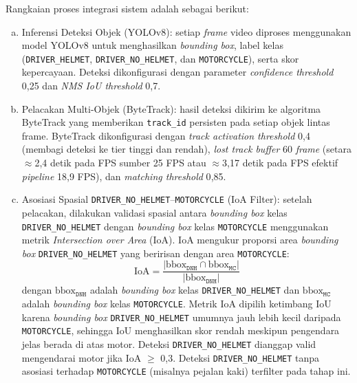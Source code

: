 Rangkaian proses integrasi sistem adalah sebagai berikut:
\begin{enumerate}[a.]
  \item {Inferensi Deteksi Objek (YOLOv8)}: setiap \textit{frame} video diproses menggunakan model YOLOv8 untuk menghasilkan \textit{bounding box}, label kelas (\texttt{DRIVER\_HELMET}, \texttt{DRIVER\_NO\_HELMET}, dan \texttt{MOTORCYCLE}), serta skor kepercayaan. Deteksi dikonfigurasi dengan parameter \textit{confidence threshold} 0{,}25 dan \textit{NMS IoU threshold} 0{,}7.

  \item {Pelacakan Multi-Objek (ByteTrack)}: hasil deteksi dikirim ke algoritma ByteTrack yang memberikan \texttt{track\_id} persisten pada setiap objek lintas frame. ByteTrack dikonfigurasi dengan \textit{track activation threshold} 0{,}4 (membagi deteksi ke tier tinggi dan rendah), \textit{lost track buffer} 60 \textit{frame} (setara $\approx$2{,}4 detik pada FPS sumber 25 FPS atau $\approx$3{,}17 detik pada FPS efektif \textit{pipeline} 18{,}9 FPS), dan \textit{matching threshold} 0{,}85.

  \item {Asosiasi Spasial \texttt{DRIVER\_NO\_HELMET}--\texttt{MOTORCYCLE} (IoA Filter)}: setelah pelacakan, dilakukan validasi spasial antara \textit{bounding box} kelas \texttt{DRIVER\_NO\_HELMET} dengan \textit{bounding box} kelas \texttt{MOTORCYCLE} menggunakan metrik \textit{Intersection over Area} (IoA). IoA mengukur proporsi area \textit{bounding box} \texttt{DRIVER\_NO\_HELMET} yang beririsan dengan area \texttt{MOTORCYCLE}:
    \begin{equation}
      \text{IoA} = \frac{|\text{bbox}_{\texttt{DNH}} \cap \text{bbox}_{\texttt{MC}}|}{|\text{bbox}_{\texttt{DNH}}|}
    \end{equation}
    dengan $\text{bbox}_{\texttt{DNH}}$ adalah \textit{bounding box} kelas \texttt{DRIVER\_NO\_HELMET} dan $\text{bbox}_{\texttt{MC}}$ adalah \textit{bounding box} kelas \texttt{MOTORCYCLE}. Metrik IoA dipilih ketimbang IoU karena \textit{bounding box} \texttt{DRIVER\_NO\_HELMET} umumnya jauh lebih kecil daripada \texttt{MOTORCYCLE}, sehingga IoU menghasilkan skor rendah meskipun pengendara jelas berada di atas motor. Deteksi \texttt{DRIVER\_NO\_HELMET} dianggap valid mengendarai motor jika IoA $\geq$ 0{,}3. Deteksi \texttt{DRIVER\_NO\_HELMET} tanpa asosiasi terhadap \texttt{MOTORCYCLE} (misalnya pejalan kaki) terfilter pada tahap ini.


\end{enumerate}
